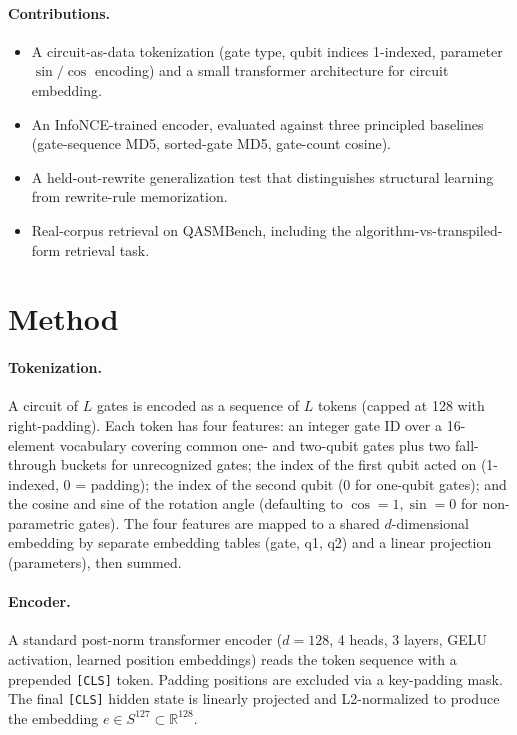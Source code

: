 \documentclass[11pt]{article}
\begin{document}
\paragraph{Contributions.}
\begin{itemize}[topsep=2pt,itemsep=2pt]
    \item A circuit-as-data tokenization (gate type, qubit indices 1-indexed, parameter $\sin/\cos$ encoding) and a small transformer architecture for circuit embedding.
    \item An InfoNCE-trained encoder, evaluated against three principled baselines (gate-sequence MD5, sorted-gate MD5, gate-count cosine).
    \item A held-out-rewrite generalization test that distinguishes structural learning from rewrite-rule memorization.
    \item Real-corpus retrieval on QASMBench, including the algorithm-vs-transpiled-form retrieval task.
\end{itemize}

\section{Method}

\paragraph{Tokenization.} A circuit of $L$ gates is encoded as a sequence of $L$ tokens (capped at 128 with right-padding). Each token has four features: an integer gate ID over a 16-element vocabulary covering common one- and two-qubit gates plus two fall-through buckets for unrecognized gates; the index of the first qubit acted on (1-indexed, 0 = padding); the index of the second qubit (0 for one-qubit gates); and the cosine and sine of the rotation angle (defaulting to $\cos = 1, \sin = 0$ for non-parametric gates). The four features are mapped to a shared $d$-dimensional embedding by separate embedding tables (gate, q1, q2) and a linear projection (parameters), then summed.

\paragraph{Encoder.} A standard post-norm transformer encoder ($d = 128$, 4 heads, 3 layers, GELU activation, learned position embeddings) reads the token sequence with a prepended \texttt{[CLS]} token. Padding positions are excluded via a key-padding mask. The final \texttt{[CLS]} hidden state is linearly projected and L2-normalized to produce the embedding $e \in S^{127} \subset \mathbb{R}^{128}$.
\end{document}
